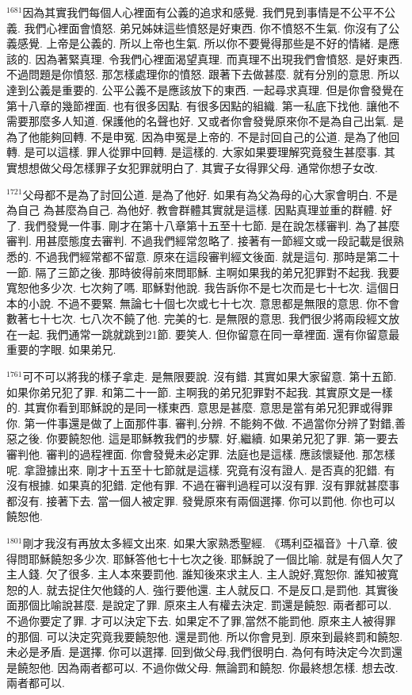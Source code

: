 \documentclass{book}
\begin{document}
$^{1681}$因為其實我們每個人心裡面有公義的追求和感覺.
我們見到事情是不公平不公義.
我們心裡面會憤怒.
弟兄姊妹這些憤怒是好東西.
你不憤怒不生氣.
你沒有了公義感覺.
上帝是公義的.
所以上帝也生氣.
所以你不要覺得那些是不好的情緒.
是應該的.
因為著緊真理.
令我們心裡面渴望真理.
而真理不出現我們會憤怒.
是好東西.
不過問題是你憤怒.
那怎樣處理你的憤怒.
跟著下去做甚麼.
就有分別的意思.
所以達到公義是重要的.
公平公義不是應該放下的東西.
一起尋求真理.
但是你會發覺在第十八章的幾節裡面.
也有很多因點.
有很多因點的組織.
第一私底下找他.
讓他不需要那麼多人知道.
保護他的名聲也好.
又或者你會發覺原來你不是為自己出氣.
是為了他能夠回轉.
不是申冤.
因為申冤是上帝的.
不是討回自己的公道.
是為了他回轉.
是可以這樣.
罪人從罪中回轉.
是這樣的.
大家如果要理解究竟發生甚麼事.
其實想想做父母怎樣罪子女犯罪就明白了.
其實子女得罪父母.
通常你想子女改.

$^{1721}$父母都不是為了討回公道.
是為了他好.
如果有為父為母的心大家會明白.
不是為自己 為甚麼為自己.
為他好.
教會群體其實就是這樣.
因點真理並重的群體.
好了.
我們發覺一件事.
剛才在第十八章第十五至十七節.
是在說怎樣審判.
為了甚麼審判.
用甚麼態度去審判.
不過我們經常忽略了.
接著有一節經文或一段記載是很熟悉的.
不過我們經常都不留意.
原來在這段審判經文後面.
就是這句.
那時是第二十一節.
隔了三節之後.
那時彼得前來問耶穌.
主啊如果我的弟兄犯罪對不起我.
我要寬恕他多少次.
七次夠了嗎.
耶穌對他說.
我告訴你不是七次而是七十七次.
這個日本的小說.
不過不要緊.
無論七十個七次或七十七次.
意思都是無限的意思.
你不會數著七十七次.
七八次不饒了他.
完美的七.
是無限的意思.
我們很少將兩段經文放在一起.
我們通常一跳就跳到21節.
要笑人.
但你留意在同一章裡面.
還有你留意最重要的字眼.
如果弟兄.

$^{1761}$可不可以將我的樣子拿走.
是無限要說.
沒有錯.
其實如果大家留意.
第十五節.
如果你弟兄犯了罪.
和第二十一節.
主啊我的弟兄犯罪對不起我.
其實原文是一樣的.
其實你看到耶穌說的是同一樣東西.
意思是甚麼.
意思是當有弟兄犯罪或得罪你.
第一件事還是做了上面那件事.
審判,分辨.
不能夠不做.
不過當你分辨了對錯,善惡之後.
你要饒恕他.
這是耶穌教我們的步驟.
好,繼續.
如果弟兄犯了罪.
第一要去審判他.
審判的過程裡面.
你會發覺未必定罪.
法庭也是這樣.
應該懷疑他.
那怎樣呢.
拿證據出來.
剛才十五至十七節就是這樣.
究竟有沒有證人.
是否真的犯錯.
有沒有根據.
如果真的犯錯.
定他有罪.
不過在審判過程可以沒有罪.
沒有罪就甚麼事都沒有.
接著下去.
當一個人被定罪.
發覺原來有兩個選擇.
你可以罰他.
你也可以饒恕他.

$^{1801}$剛才我沒有再放太多經文出來.
如果大家熟悉聖經.
《瑪利亞福音》十八章.
彼得問耶穌饒恕多少次.
耶穌答他七十七次之後.
耶穌說了一個比喻.
就是有個人欠了主人錢.
欠了很多.
主人本來要罰他.
誰知後來求主人.
主人說好,寬恕你.
誰知被寬恕的人.
就去捉住欠他錢的人.
強行要他還.
主人就反口.
不是反口,是罰他.
其實後面那個比喻說甚麼.
是說定了罪.
原來主人有權去決定.
罰還是饒恕.
兩者都可以.
不過你要定了罪.
才可以決定下去.
如果定不了罪,當然不能罰他.
原來主人被得罪的那個.
可以決定究竟我要饒恕他.
還是罰他.
所以你會見到.
原來到最終罰和饒恕.
未必是矛盾.
是選擇.
你可以選擇.
回到做父母,我們很明白.
為何有時決定今次罰還是饒恕他.
因為兩者都可以.
不過你做父母.
無論罰和饒恕.
你最終想怎樣.
想去改.
兩者都可以.
\end{document}
